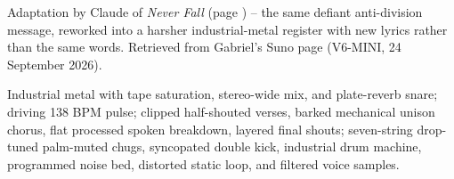 
\begin{notes}
Adaptation by Claude of \emph{Never Fall} (page \pageref{sec:never-fall}) -- the same defiant anti-division message, reworked into a harsher industrial-metal register with new lyrics rather than the same words. Retrieved from Gabriel's Suno page (V6-MINI, 24 September 2026).
\end{notes}
\begin{style}
Industrial metal with tape saturation, stereo-wide mix, and plate-reverb snare; driving 138 BPM pulse; clipped half-shouted verses, barked mechanical unison chorus, flat processed spoken breakdown, layered final shouts; seven-string drop-tuned palm-muted chugs, syncopated double kick, industrial drum machine, programmed noise bed, distorted static loop, and filtered voice samples.
\end{style}
